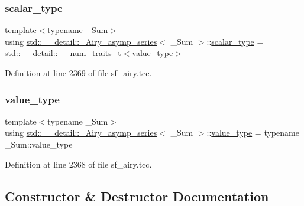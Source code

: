\subsubsection{\texorpdfstring{scalar\+\_\+type}{scalar\_type}}
{\footnotesize\ttfamily template$<$typename \+\_\+\+Sum$>$ \\
using \hyperlink{classstd_1_1____detail_1_1__Airy__asymp__series}{std\+::\+\_\+\+\_\+detail\+::\+\_\+\+Airy\+\_\+asymp\+\_\+series}$<$ \+\_\+\+Sum $>$\+::\hyperlink{classstd_1_1____detail_1_1__Airy__asymp__series_a17ec74b13ebc38d5531bf27cd31684fb}{scalar\+\_\+type} =  std\+::\+\_\+\+\_\+detail\+::\+\_\+\+\_\+num\+\_\+traits\+\_\+t$<$\hyperlink{classstd_1_1____detail_1_1__Airy__asymp__series_a729a698f23629a2f94b6ef71f377efc5}{value\+\_\+type}$>$}



Definition at line 2369 of file sf\+\_\+airy.\+tcc.

\mbox{\label{classstd_1_1____detail_1_1__Airy__asymp__series_a729a698f23629a2f94b6ef71f377efc5}} 
\subsubsection{\texorpdfstring{value\+\_\+type}{value\_type}}
{\footnotesize\ttfamily template$<$typename \+\_\+\+Sum$>$ \\
using \hyperlink{classstd_1_1____detail_1_1__Airy__asymp__series}{std\+::\+\_\+\+\_\+detail\+::\+\_\+\+Airy\+\_\+asymp\+\_\+series}$<$ \+\_\+\+Sum $>$\+::\hyperlink{classstd_1_1____detail_1_1__Airy__asymp__series_a729a698f23629a2f94b6ef71f377efc5}{value\+\_\+type} =  typename \+\_\+\+Sum\+::value\+\_\+type}



Definition at line 2368 of file sf\+\_\+airy.\+tcc.



\subsection{Constructor \& Destructor Documentation}
\mbox{\label{classstd_1_1____detail_1_1__Airy__asymp__series_a2768b3e101876b969b606cbde8b2e133}} 
